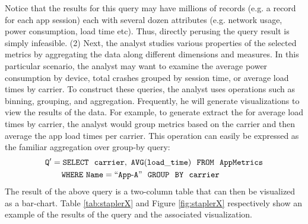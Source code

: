 \noindent Notice that the results for this query may have millions of records
(e.g. a record for each app session) each with several dozen attributes (e.g.
network usage, power consumption, load time etc).
Thus, directly perusing the query result is simply infeasible.
(2) Next, the analyst studies various properties of the selected metrics by
aggregating the data along different dimensions and measures. 
In this particular scenario, the analyst may want to examine the average power
consumption by device, total crashes grouped by session time, or average load
times by carrier.
To construct these queries, the analyst uses operations such as binning,
grouping, and aggregation.  Frequently, he will generate visualizations to view
the results of the data.
For example, to generate extract the for average load times by carrier, the
analyst would group metrics based on the carrier and then average the app load
times per carrier.
This operation can easily be expressed as the familiar aggregation over group-by
query:
\noindent
\begin{align*}
& \tt Q' = SELECT \ \ carrier,\ AVG(load\_time) \ \ FROM \ \  AppMetrics \\
& \tt \hspace{20pt} WHERE\ Name=``App\text{-}A" \ \ GROUP  \ \ BY \ \ carrier
\end{align*}
The result of the above query is a two-column table that can then be visualized
as a bar-chart. Table \ref{tab:staplerX} and Figure
\ref{fig:staplerX} respectively show an example of the results of the query and
the associated visualization.


